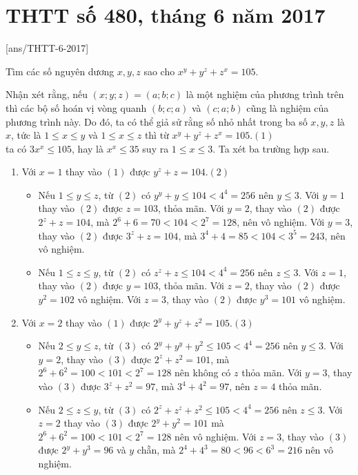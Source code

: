\section{THTT số 480, tháng 6 năm 2017}
[ans/THTT-6-2017]

\begin{bt}%
Tìm các số nguyên dương $x, y, z$ sao cho
$x^y+y^z+z^x=105$.
\loigiai
	{Nhận xét rằng, nếu 
			 $(x; y; z)=(a; b; c)$ là một nghiệm của phương trình trên thì các bộ số hoán vị vòng quanh $(b; c; a)$ và $(c; a; b)$ cũng là nghiệm của phương trình này.
Do đó, ta có thể giả sử rằng số nhỏ nhất trong ba số $x, y, z$ là $x$, tức là $1 \leq x \leq y$ và $1 \leq x \leq z$ thì từ $x^y+y^z+z^x=105  $.\hfill$(1)$\\
ta có  $3x^x \leq 105$, hay là $x^x \leq 35$ suy ra $1 \leq x \leq 3$. Ta xét  ba trường hợp sau.  
		\begin{enumerate}
			\item Với $x=1$ thay vào $(1)$ được $y^z+z=104$.\hfill$(2)$
			\begin{itemize}
				\item 
				Nếu $1 \leq y \leq z$, từ $(2)$ có $y^y+y \leq 104<4^4=256$ nên $y \leq 3$. Với $y=1$ thay vào $(2)$ được $z=103$, thỏa mãn. 
				Với $y=2$, thay vào $(2)$ được $2^z+z=104$, mà $2^6+6=70<104<2^7=128$, nên vô nghiệm. Với $y=3$, thay vào $(2)$ được $3^z+z=104$, mà $3^4+4=85<104<3^5=243$, nên vô nghiệm.
			\end{itemize}				
			\begin{itemize}
				\item Nếu $1 \leq z \leq y$, từ $(2)$ có $z^z+z \leq 104<4^4=256$ nên $z \leq 3$. 
				Với $z=1$, thay vào $(2)$ được $y=103$, thỏa mãn. 
				Với $z=2$, thay vào $(2)$ được $y^2=102$ vô nghiệm. 
				Với $z=3$, thay vào $(2)$ được $y^3=101$ vô nghiệm. 
			\end{itemize}
			\item 	Với $x=2$ thay vào $(1)$ được $2^y+y^z+z^2=105$.\hfill$(3)$			
			\begin{itemize}
				\item Nếu $2 \leq y \leq z$, từ $(3)$ có $2^y+y^y+y^2 \leq 105<4^4=256$ nên $y \leq 3$. 
				Với $y=2$, thay vào $(3)$ được $2^z+z^2=101$, mà $2^6+6^2=100<101<2^7=128$ nên không có $z$ thỏa mãn.
				Với $y=3$, thay vào $(3)$ được $3^z+z^2=97$, mà $3^4+4^2=97$, nên $z=4$ thỏa mãn. 
			\end{itemize} 
			\begin{itemize}
				\item 
				Nếu $2 \leq z \leq y$, từ $(3)$ có $2^z+z^z+z^2 \leq 105<4^4=256$ nên $z \leq 3$. 
				Với $z=2$ thay vào $(3)$ được $2^y+y^2=101$ mà $2^6+6^2=100<101<2^7=128$ nên vô nghiệm. 
				Với $z=3$, thay vào $(3)$ được $2^y+y^3=96$ và $y$ chẵn, mà $2^4+4^3=80<96<6^3=216$ nên vô nghiệm. 
			\end{itemize} 
			

\end{enumerate}}
\end{bt}
